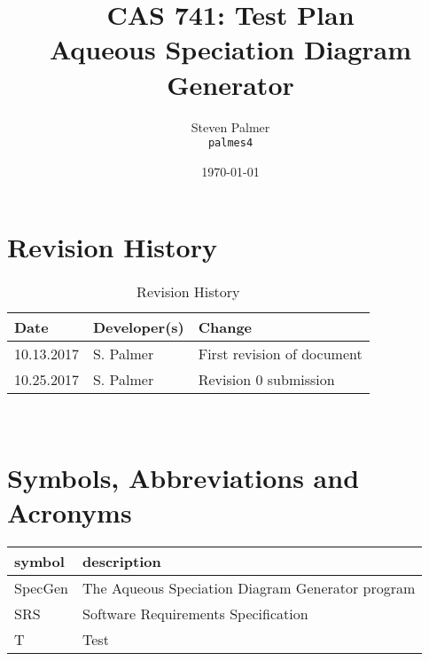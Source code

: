 \documentclass[12pt, titlepage]{article}
\newcommand{\progname}{SpecGen}
\begin{document}

\title{CAS 741: Test Plan\\[10pt]\Large Aqueous Speciation Diagram Generator}
\author{Steven Palmer\\\texttt{palmes4}}
\date{\today}
	
\maketitle


\setcounter{secnumdepth}{0}

\section{Revision History}

\begin{table}[hp]
\caption{Revision History} \label{TblRevisionHistory}
\begin{tabularx}{\textwidth}{llX}
\toprule
\textbf{Date} & \textbf{Developer(s)} & \textbf{Change}\\
\midrule
10.13.2017 & S. Palmer & First revision of document\\
10.25.2017 & S. Palmer & Revision 0 submission\\
\bottomrule
\end{tabularx}
\end{table}

~\newpage


\section{Symbols, Abbreviations and Acronyms}

\renewcommand{\arraystretch}{1.2}
\begin{tabular}{l l} 
  \toprule		
  \textbf{symbol} & \textbf{description}\\
  \midrule
  \progname{} & The Aqueous Speciation Diagram Generator program\\  
  SRS & Software Requirements Specification\\
  T & Test\\
  \bottomrule
\end{tabular}\\

\newpage

\tableofcontents


\newpage


\end{document}
